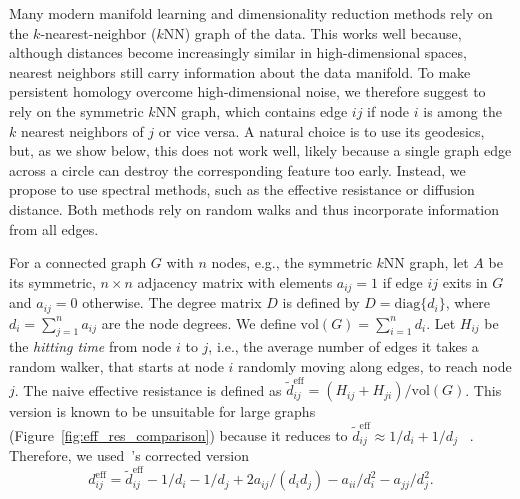 \documentclass{article}
\theoremstyle{plain}
\theoremstyle{definition}
\theoremstyle{remark}
\begin{document}
Many modern manifold learning and dimensionality reduction methods rely on the $k$-nearest-neighbor ($k$NN) graph of the data. This works well because, although distances become increasingly similar in high-dimensional spaces, nearest neighbors still carry information about the data manifold. To make persistent homology overcome high-dimensional noise, we therefore suggest to rely on the symmetric $k$NN graph, which contains edge $ij$ if node $i$ is among the $k$ nearest neighbors of $j$ or vice versa. A natural choice is to use its geodesics, but, as we show below, this does not work well, likely because a single graph edge across a circle can destroy the corresponding feature too early. Instead, we propose to use spectral methods, such as the effective resistance or diffusion distance. Both methods rely on random walks and thus incorporate information from all edges. 

For a connected graph $G$ with $n$ nodes, e.g., the symmetric $k$NN graph, let $A$ be its symmetric, $n\times n$ adjacency matrix with elements $a_{ij}=1$ if edge $ij$ exits in $G$ and $a_{ij}=0$ otherwise. The degree matrix $D$ is defined by $D = \text{diag}\{d_i\}$, where $d_i = \sum_{j=1}^n a_{ij}$ are the node degrees. We define $\text{vol}(G) = \sum_{i=1}^n d_i$. Let $H_{ij}$ be the \textit{hitting time} from node $i$ to $j$, i.e., the average number of edges it takes a random walker, that starts at node $i$ randomly moving along edges, to reach node $j$. The naive effective resistance is defined as $\tilde{d}^\text{eff}_{ij} = (H_{ij} + H_{ji}) / \text{vol}(G)$. This version is known to be unsuitable for large graphs (Figure~\ref{fig:eff_res_comparison}) because it reduces to $\tilde{d}^\text{eff}_{ij} \approx 1/d_i + 1/d_j$ ~\citep{luxburg2010getting}. Therefore, we used~\citet{luxburg2010getting}'s corrected version
\begin{equation}
    d^\text{eff}_{ij} = \tilde{d}^\text{eff}_{ij} - 1/d_i - 1/d_j + 2 a_{ij}/(d_id_j) - a_{ii}/d_i^2 - a_{jj}/d_j^2.
\end{equation}
\end{document}
